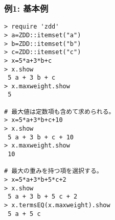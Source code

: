 \subsubsection*{例1: 基本例}



\begin{Verbatim}[baselinestretch=0.7,frame=single]
> require 'zdd'
> a=ZDD::itemset("a")
> b=ZDD::itemset("b")
> c=ZDD::itemset("c")
> x=5*a+3*b+c
> x.show
 5 a + 3 b + c
> x.maxweight.show
 5

# 最大値は定数項も含めて求められる。
> x=5*a+3*b+c+10
> x.show
 5 a + 3 b + c + 10
> x.maxweight.show
 10

# 最大の重みを持つ項を選択する。
> x=5*a+3*b+5*c+2
> x.show
 5 a + 3 b + 5 c + 2
> x.termsEQ(x.maxweight).show
 5 a + 5 c
\end{Verbatim}
